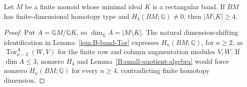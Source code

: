 \begin{corollary}\label{B:four-outside-minimal-band}
Let $M$ be a finite monoid whose minimal ideal $K$ is a rectangular
band.  If $BM$ has finite-dimensional homotopy type and
$H_4(BM;\mathbb Q)\ne0$, then $|M\setminus K|\geq4$.
\end{corollary}

\begin{proof}
Put $A=\mathbb QM/\mathbb QK$, so
$\dim_{\mathbb Q}A=|M\setminus K|$.
The natural dimension-shifting identification in
Lemma~\ref{lem:B-band-Tor} expresses $H_n(BM;\mathbb Q)$, for
$n\geq2$, as $\operatorname{Tor}_{n-2}^A(W,V)$ for the finite
row and column augmentation modules $V,W$.
If $\dim A\leq3$, nonzero $H_4$ and
Lemma~\ref{B:small-quotient-algebra} would force nonzero
$H_n(BM;\mathbb Q)$ for every $n\geq4$, contradicting finite
homotopy dimension.
\end{proof}
